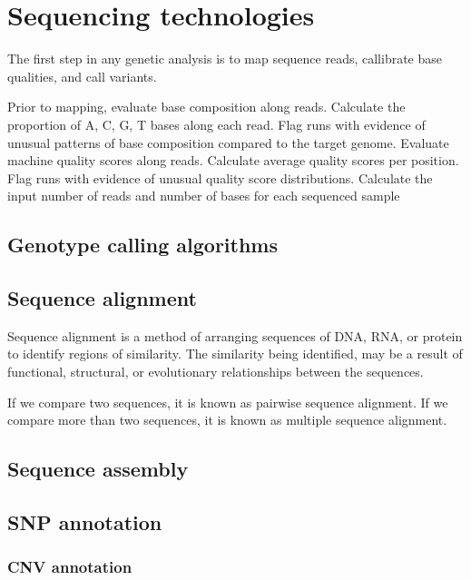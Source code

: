 \documentclass[]{book}
\theoremstyle{definition}
\theoremstyle{definition}
\theoremstyle{definition}
\theoremstyle{remark}
\begin{document}
\chapter{Sequencing technologies}\label{sequencing-technologies}

The first step in any genetic analysis is to map sequence reads,
callibrate base qualities, and call variants.

Prior to mapping, evaluate base composition along reads. Calculate the
proportion of A, C, G, T bases along each read. Flag runs with evidence
of unusual patterns of base composition compared to the target genome.
Evaluate machine quality scores along reads. Calculate average quality
scores per position. Flag runs with evidence of unusual quality score
distributions. Calculate the input number of reads and number of bases
for each sequenced sample

\section{Genotype calling algorithms}\label{genotype-calling-algorithms}

\section{Sequence alignment}\label{sequence-alignment}

Sequence alignment is a method of arranging sequences of DNA, RNA, or
protein to identify regions of similarity. The similarity being
identified, may be a result of functional, structural, or evolutionary
relationships between the sequences.

If we compare two sequences, it is known as pairwise sequence alignment.
If we compare more than two sequences, it is known as multiple sequence
alignment.

\section{Sequence assembly}\label{sequence-assembly}

\section{SNP annotation}\label{snp-annotation}

\subsection{CNV annotation}\label{cnv-annotation}
\end{document}

